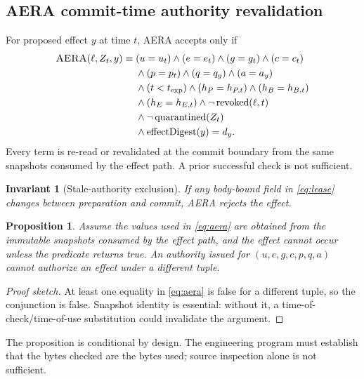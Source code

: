 \documentclass[journal,10pt]{IEEEtran}
\newcommand{\AERA}{\textsc{AERA}}
\newtheorem{proposition}{Proposition}
\newtheorem{invariant}{Invariant}
\begin{document}
\subsection{AERA commit-time authority revalidation}
For proposed effect $y$ at time $t$, \AERA{} accepts only if
\begin{align}
\AERA(\ell,Z_t,y)\equiv{}&
 (u=u_t)\land(e=e_t)\land(g=g_t)\land(c=c_t)\nonumber\\
&\land(p=p_t)\land(q=q_y)\land(a=a_y)\nonumber\\
&\land(t<t_{\mathrm{exp}})\land(h_P=h_{P,t})\land(h_B=h_{B,t})\nonumber\\
&\land(h_E=h_{E,t})\land\neg\operatorname{revoked}(\ell,t)\nonumber\\
&\land\neg\operatorname{quarantined}(Z_t)\nonumber\\
&\land\operatorname{effectDigest}(y)=d_y. \label{eq:aera}
\end{align}
Every term is re-read or revalidated at the commit boundary from the same snapshots consumed by the effect path. A prior successful check is not sufficient.

\begin{invariant}[Stale-authority exclusion]
If any body-bound field in \eqref{eq:lease} changes between preparation and commit, \AERA{} rejects the effect.
\end{invariant}

\begin{proposition}
Assume the values used in \eqref{eq:aera} are obtained from the immutable snapshots consumed by the effect path, and the effect cannot occur unless the predicate returns true. An authority issued for $(u,e,g,c,p,q,a)$ cannot authorize an effect under a different tuple.
\end{proposition}

\begin{proof}[Proof sketch]
At least one equality in \eqref{eq:aera} is false for a different tuple, so the conjunction is false. Snapshot identity is essential: without it, a time-of-check/time-of-use substitution could invalidate the argument.
\end{proof}

The proposition is conditional by design. The engineering program must establish that the bytes checked are the bytes used; source inspection alone is not sufficient.
\end{document}
